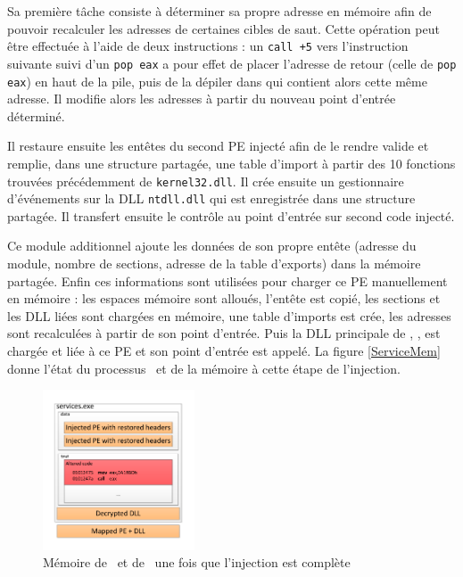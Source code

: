 Sa première tâche consiste à déterminer sa propre adresse en mémoire afin de pouvoir recalculer les adresses de certaines cibles de saut.
Cette opération peut être effectuée à l'aide de deux instructions : un \texttt{call +5} vers l'instruction suivante suivi d'un \texttt{pop eax} a pour effet de placer l'adresse de retour (celle de \texttt{pop eax}) en haut de la pile, puis de la dépiler dans \eax qui contient alors cette même adresse.
Il modifie alors les adresses à partir du nouveau point d'entrée déterminé.

Il restaure ensuite les entêtes du second PE injecté afin de le rendre valide et remplie, dans une structure partagée, une table d'import à partir des 10 fonctions trouvées précédemment de \texttt{kernel32.dll}.
Il crée ensuite un gestionnaire d’événements sur la DLL \texttt{ntdll.dll} qui est enregistrée dans une structure partagée.
Il transfert ensuite le contrôle au point d'entrée sur second code injecté.

Ce module additionnel ajoute les données de son propre entête (adresse du module, nombre de sections, adresse de la table d'exports) dans la mémoire partagée.
Enfin ces informations sont utilisées pour charger ce PE manuellement en mémoire : les espaces mémoire sont alloués, l'entête est copié, les sections et les DLL liées sont chargées en mémoire, une table d'imports est crée, les adresses sont recalculées à partir de son point d'entrée.
Puis la DLL principale de \duqu, \netpDLL, est chargée et liée à ce PE et son point d'entrée est appelé.
La figure \ref{ServiceMem} donne l'état du processus \services\ et de la mémoire à cette étape de l'injection.

\begin{figure}[h]
\begin{center}
\includegraphics[width=0.4\textwidth]{supports/duqu/injectionDuquMalware.pdf} 
\end{center}
\caption{Mémoire de \services\ et de \duqu\ une fois que l'injection est complète}
\label{fig:ServiceMem}
\end{figure}

